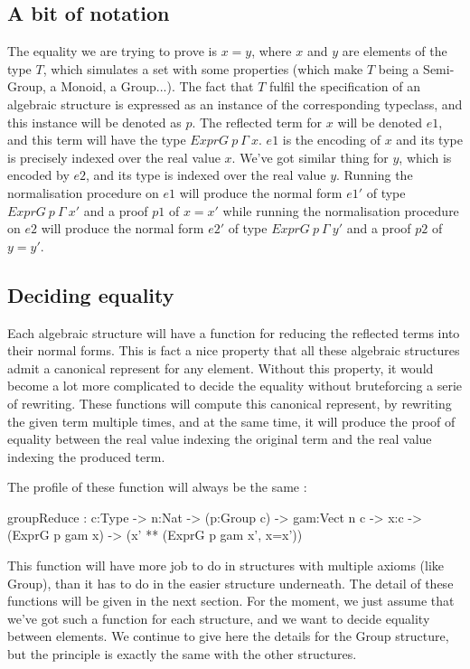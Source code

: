 \documentclass{sigplanconf}
\begin{document}
	\subsection { A bit of notation}
The equality we are trying to prove is $x=y$, where $x$ and $y$ are elements of the type $T$, which  simulates a set with some properties (which make $T$ being a Semi-Group, a Monoid, a Group...). The fact that $T$ fulfil the specification of an algebraic structure is expressed as an instance of the corresponding typeclass, and this instance will be denoted as $p$.
The reflected term for $x$ will be denoted $e1$, and this term will have the type $ExprG\ p\ \Gamma\ x$. $e1$ is the encoding of $x$ and its type is precisely indexed over the real value $x$.
We've got similar thing for $y$, which is encoded by $e2$, and its type is indexed over the real value $y$.
Running the normalisation procedure on $e1$ will produce the normal form $e1'$ of type $ExprG\ p\ \Gamma\ x'$ and a proof $p1$ of $x=x'$ while running the normalisation procedure on $e2$ will produce the normal form $e2'$ of type $ExprG\ p\ \Gamma\ y'$ and a proof $p2$ of $y=y'$.

	\subsection {Deciding equality}
	
Each algebraic structure will have a function for reducing the reflected terms into their normal forms. This is fact a nice property that all these algebraic structures admit a canonical represent for any element. Without this property, it would become a lot more complicated to decide the equality without bruteforcing a serie of rewriting.
These functions will compute this canonical represent, by rewriting the given term multiple times, and at the same time, it will produce the proof of equality between the real value indexing the original term and the real value indexing the produced term.

The profile of these function will always be the same :
\begin{code}[caption=Type of the reduction function for terms reflecting elements in a Group, captionpos=b, label=lst1:haskell2]
	groupReduce : {c:Type} -> {n:Nat} 
	  -> (p:Group c) -> {gam:Vect n c} -> {x:c}
	  -> (ExprG p gam x) 
	  -> (x' ** (ExprG p gam x', x=x'))
\end{code}

This function will have more job to do in structures with multiple axioms (like Group), than it has to do in the easier structure underneath.
The detail of these functions will be given in the next section. For the moment, we just assume that we've got such a function for each structure, and we want to decide equality between elements. We continue to give here the details for the Group structure, but the principle is exactly the same with the other structures.
\end{document}
